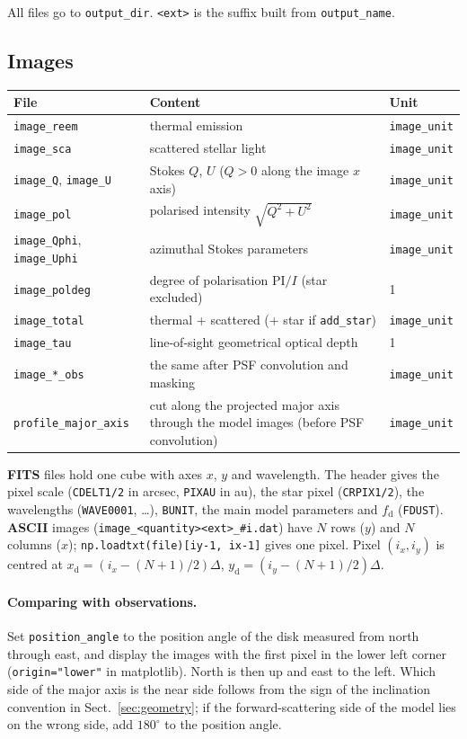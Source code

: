 \documentclass[11pt,a4paper]{article}
\newcommand{\code}[1]{\texttt{#1}}
\begin{document}
All files go to \code{output\_dir}. \code{<ext>} is the suffix built from \code{output\_name}.

\subsection{Images}

\small
\begin{longtable}{@{}R{4.2cm}R{8.0cm}R{2.6cm}@{}}
\toprule
File & Content & Unit \\
\midrule
\endhead
\code{image\_reem} & thermal emission & \code{image\_unit} \\
\code{image\_sca} & scattered stellar light & \code{image\_unit} \\
\code{image\_Q}, \code{image\_U} & Stokes $Q$, $U$ ($Q>0$ along the image $x$ axis) & \code{image\_unit} \\
\code{image\_pol} & polarised intensity $\sqrt{Q^2+U^2}$ & \code{image\_unit} \\
\code{image\_Qphi}, \code{image\_Uphi} & azimuthal Stokes parameters & \code{image\_unit} \\
\code{image\_poldeg} & degree of polarisation $\mathrm{PI}/I$ (star excluded) & 1 \\
\code{image\_total} & thermal + scattered (+ star if \code{add\_star}) & \code{image\_unit} \\
\code{image\_tau} & line-of-sight geometrical optical depth & 1 \\
\code{image\_*\_obs} & the same after PSF convolution and masking & \code{image\_unit} \\
\code{profile\_major\_axis} & cut along the projected major axis through the model images
  (before PSF convolution) & \code{image\_unit} \\
\bottomrule
\end{longtable}
\normalsize

\textbf{FITS} files hold one cube with axes $x$, $y$ and wavelength. The header gives the pixel
scale (\code{CDELT1/2} in arcsec, \code{PIXAU} in au), the star pixel (\code{CRPIX1/2}), the
wavelengths (\code{WAVE0001}, \ldots), \code{BUNIT}, the main model parameters and $f_\mathrm{d}$
(\code{FDUST}). \textbf{ASCII} images (\code{image\_<quantity><ext>\_\#i.dat}) have $N$ rows
($y$) and $N$ columns ($x$); \code{np.loadtxt(file)[iy-1, ix-1]} gives one pixel. Pixel
$(i_x,i_y)$ is centred at $x_\mathrm{d}=(i_x-(N+1)/2)\Delta$, $y_\mathrm{d}=(i_y-(N+1)/2)\Delta$.

\paragraph{Comparing with observations.} Set \code{position\_angle} to the position angle of the
disk measured from north through east, and display the images with the first pixel in the lower
left corner (\code{origin="lower"} in matplotlib). North is then up and east to the left. Which side
of the major axis is the near side follows from the sign of the inclination convention in
Sect.~\ref{sec:geometry}; if the forward-scattering side of the model lies on the wrong side, add
$180^\circ$ to the position angle.
\end{document}
